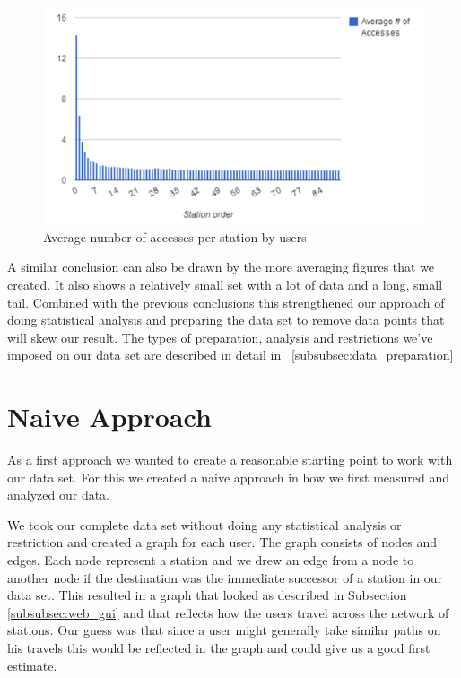 \begin{figure}[!ht]
	\caption{Average number of accesses per station by users}
	\centering
	\includegraphics[width=1.0\textwidth]{charts/number_stations_average_user}
\end{figure}

A similar conclusion can also be drawn by the more averaging figures that we created. It also shows a relatively small set with a lot of data and a long, small tail. Combined with the previous conclusions this strengthened our approach of doing statistical analysis and preparing the data set to remove data points that will skew our result. The types of preparation, analysis and restrictions we've imposed on our data set are described in detail in ~\ref{subsubsec:data_preparation}

\section{Naive Approach}

As a first approach we wanted to create a reasonable starting point to work with our data set. For this we created a naive approach in how we first measured and analyzed our data. 

We took our complete data set without doing any statistical analysis or restriction and created a graph for each user. The graph consists of nodes and edges. Each node represent a station and we drew an edge from a node to another node if the destination was the immediate successor of a station in our data set. This resulted in a graph that looked as described in Subsection \ref{subsubsec:web_gui} and that reflects how the users travel across the network of stations. Our guess was that since a user might generally take similar paths on his travels this would be reflected in the graph and could give us a good first estimate.

